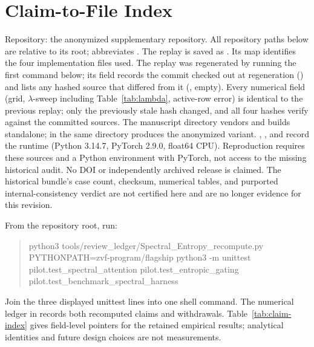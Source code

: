 \documentclass{article}
\newcommand{\repolocation}{the anonymized supplementary repository}
\newcommand{\repolocation}{\url{https://github.com/arvindcr4/tinker-rl-lab}}
\begin{document}
\appendix
\section{Claim-to-File Index}
\label{app:artifact}

Repository: \repolocation.
All repository paths below are relative to its root;  abbreviates
. The replay is saved as
.
Its  map identifies the four implementation files used.
The replay was regenerated by running the first command below; its
 field records the commit checked out at regeneration
() and lists any hashed source that differed from it
(, empty). Every numerical field (grid,
$\lambda$-sweep including Table~\ref{tab:lambda}, active-row error) is
identical to the previous replay; only the previously stale
 hash changed, and all four hashes verify against the
committed sources. The manuscript directory vendors 
and builds standalone;  in the same
directory produces the anonymized variant.
, , and  record the runtime (Python
3.14.7, PyTorch 2.9.0, float64 CPU). Reproduction requires these sources and a
Python environment with PyTorch, not access to the missing historical audit.
No DOI or independently archived release is claimed. The historical bundle's
case count, checksum, numerical tables, and purported internal-consistency
verdict are not certified here and are no longer evidence for this revision.

From the repository root, run:
\begin{quote}\small\ttfamily
python3 tools/review\_ledger/Spectral\_Entropy\_recompute.py\\
PYTHONPATH=zvf-program/flagship python3 -m unittest\\
\hspace*{1em}pilot.test\_spectral\_attention pilot.test\_entropic\_gating\\
\hspace*{1em}pilot.test\_benchmark\_spectral\_harness
\end{quote}
Join the three displayed unittest lines into one shell command.
The numerical ledger in
 records both recomputed
claims and withdrawals. Table~\ref{tab:claim-index} gives field-level pointers
for the retained empirical results; analytical identities and future design
choices are not measurements.
\end{document}
